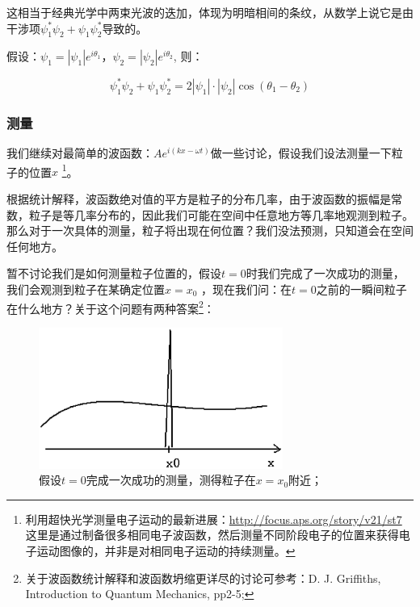 这相当于经典光学中两束光波的迭加，体现为明暗相间的条纹，从数学上说它是由干涉项$\psi_1^*\psi_2 + \psi_1\psi_2^*$导致的。

假设：$\psi_1 = |\psi_1| e^{i \theta_1}$，$\psi_2 = |\psi_2| e^{i \theta_2}$, 则：

\begin{equation}
\psi_1^* \psi_2 + \psi_1 \psi_2^*  = 2 |\psi_1 | \cdot | \psi_2 | \cos (\theta_1 -\theta_2)
\end{equation}


\subsubsection{测量}


我们继续对最简单的波函数：$A e^{i(kx - \omega t)}
$做一些讨论，假设我们设法测量一下粒子的位置$x$
\footnote{利用超快光学测量电子运动的最新进展：\url{http://focus.aps.org/story/v21/st7}
这里是通过制备很多相同电子波函数，然后测量不同阶段电子的位置来获得电子运动图像的，并非是对相同电子运动的持续测量。}。

根据统计解释，波函数绝对值的平方是粒子的分布几率，由于波函数的振幅是常数，粒子是等几率分布的，因此我们可能在空间中任意地方等几率地观测到粒子。那么对于一次具体的测量，粒子将出现在何位置？我们没法预测，只知道会在空间任何地方。

暂不讨论我们是如何测量粒子位置的，假设$t=0$时我们完成了一次成功的测量，我们会观测到粒子在某确定位置$x=x_0$
，现在我们问：在$t=0$之前的一瞬间粒子在什么地方？关于这个问题有两种答案\footnote{关于波函数统计解释和波函数坍缩更详尽的讨论可参考：D. J. Griffiths, Introduction to Quantum Mechanics, pp2-5;}：

\begin{figure}[htbp]
\begin{center}
\includegraphics[width=8cm]{QuantumIntro/peak_atx0.ps}
\caption{假设$t=0$完成一次成功的测量，测得粒子在$x=x_0$附近；}
\end{center}
\end{figure}


